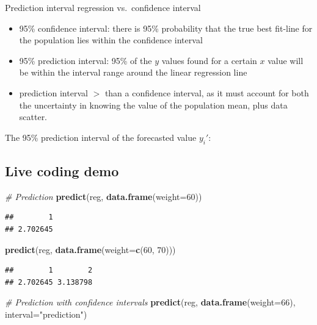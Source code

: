 \documentclass[]{article}
\newenvironment{Shaded}{\begin{snugshade}}{\end{snugshade}}
\newcommand{\CommentTok}[1]{\textcolor[rgb]{0.56,0.35,0.01}{\textit{#1}}}
\newcommand{\DataTypeTok}[1]{\textcolor[rgb]{0.13,0.29,0.53}{#1}}
\newcommand{\DecValTok}[1]{\textcolor[rgb]{0.00,0.00,0.81}{#1}}
\newcommand{\KeywordTok}[1]{\textcolor[rgb]{0.13,0.29,0.53}{\textbf{#1}}}
\newcommand{\NormalTok}[1]{#1}
\newcommand{\StringTok}[1]{\textcolor[rgb]{0.31,0.60,0.02}{#1}}
\providecommand{\tightlist}{%
  \setlength{\itemsep}{0pt}\setlength{\parskip}{0pt}}
\begin{document}
Prediction interval regression vs.~confidence interval

\begin{itemize}
\tightlist
\item
  95\% confidence interval: there is 95\% probability that the true best
  fit-line for the population lies within the confidence interval
\item
  95\% prediction interval: 95\% of the \(y\) values found for a certain
  \(x\) value will be within the interval range around the linear
  regression line
\item
  prediction interval \(>\) than a confidence interval, as it must
  account for both the uncertainty in knowing the value of the
  population mean, plus data scatter.
\end{itemize}

The 95\% prediction interval of the forecasted value \(y_i'\):

\hypertarget{live-coding-demo-1}{%
\subsection{Live coding demo}\label{live-coding-demo-1}}

\begin{Shaded}
\begin{Highlighting}[]
\CommentTok{# Prediction}
\KeywordTok{predict}\NormalTok{(reg, }\KeywordTok{data.frame}\NormalTok{(}\DataTypeTok{weight=}\DecValTok{60}\NormalTok{))}
\end{Highlighting}
\end{Shaded}

\begin{verbatim}
##        1 
## 2.702645
\end{verbatim}

\begin{Shaded}
\begin{Highlighting}[]
\KeywordTok{predict}\NormalTok{(reg, }\KeywordTok{data.frame}\NormalTok{(}\DataTypeTok{weight=}\KeywordTok{c}\NormalTok{(}\DecValTok{60}\NormalTok{, }\DecValTok{70}\NormalTok{)))}
\end{Highlighting}
\end{Shaded}

\begin{verbatim}
##        1        2 
## 2.702645 3.138798
\end{verbatim}

\begin{Shaded}
\begin{Highlighting}[]
\CommentTok{# Prediction with confidence intervals}
\KeywordTok{predict}\NormalTok{(reg, }\KeywordTok{data.frame}\NormalTok{(}\DataTypeTok{weight=}\DecValTok{66}\NormalTok{), }\DataTypeTok{interval=}\StringTok{"prediction"}\NormalTok{)}
\end{Highlighting}
\end{Shaded}
\end{document}
